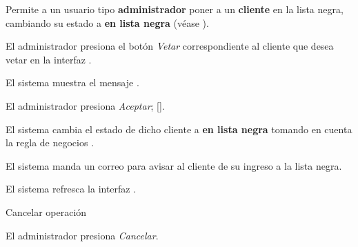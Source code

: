 %
%

{
  Permite a un usuario tipo \textbf{administrador} poner a un \textbf{cliente}
  en la lista negra, cambiando su estado a \textbf{en lista negra} (véase
  ).

  \begin{trayectoriaPrincipal}

    \item El administrador presiona el botón \textit{Vetar}
      correspondiente al cliente que desea vetar en la interfaz
      .

    \item El sistema muestra el mensaje .

    \item El administrador presiona \textit{Aceptar};
      [].

    \item El sistema cambia el estado de dicho cliente a \textbf{en lista negra}
      tomando en cuenta la regla de negocios .

    \item El sistema manda un correo para avisar al cliente de su
      ingreso a la lista negra.

    \item El sistema refresca la interfaz .

  \end{trayectoriaPrincipal}


  \begin{trayectoriaAlternativa}[ta:cancelar]
    {Cancelar operación}

    \item El administrador presiona \textit{Cancelar}.

  \end{trayectoriaAlternativa}
}
